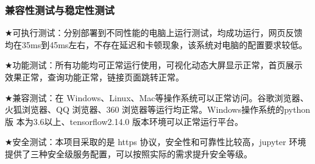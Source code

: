\documentclass[withoutpreface,bwprint]{cumcmthesis} %
\begin{document}
	\subsubsection{ 兼容性测试与稳定性测试}
	$\bigstar$可执行测试：分别部署到不同性能的电脑上运行测试，均成功运行，网页反馈
	均在35ms到45ms左右，不存在延迟和卡顿现象，该系统对电脑的配置要求较低。\par
	$\bigstar$功能测试：所有功能均可正常运行使用，可视化动态大屏显示正常，首页展示
	效果正常，查询功能正常，链接页面跳转正常。\par
	$\bigstar$兼容测试：在 Windows、Linux、Mac等操作系统可以正常访问。谷歌浏览器、
	火狐浏览器、QQ 浏览器、360 浏览器等运行均正常。Windows操作系统的python版
	本为3.6以上、tensorflow2.14.0 版本环境可以正常运行平台。\par
	$\bigstar$安全测试：本项目采取的是 https 协议，安全性和可靠性比较高，jupyter 环境
	提供了三种安全级服务配置，可以按照实际的需求提升安全等级。\par
	\newpage
\end{document}
